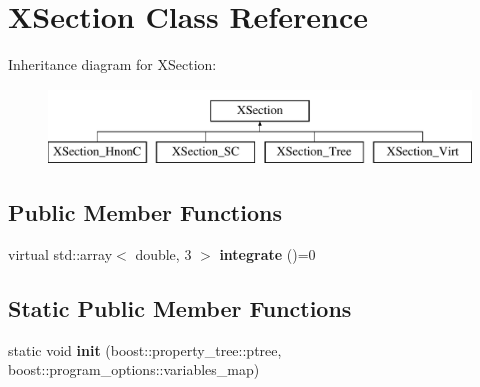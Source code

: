 \hypertarget{classXSection}{}\section{X\+Section Class Reference}
\label{classXSection}
Inheritance diagram for X\+Section\+:\begin{figure}[H]
\begin{center}
\leavevmode
\includegraphics[height=2.000000cm]{classXSection}
\end{center}
\end{figure}
\subsection*{Public Member Functions}
\begin{DoxyCompactItemize}
\item 
\mbox{\label{classXSection_ad697c9f68154808c927267666e8a1d37}} 
virtual std\+::array$<$ double, 3 $>$ {\bfseries integrate} ()=0
\end{DoxyCompactItemize}
\subsection*{Static Public Member Functions}
\begin{DoxyCompactItemize}
\item 
\mbox{\label{classXSection_a6cc33979c6bb62f6812a7e3768f84032}} 
static void {\bfseries init} (boost\+::property\+\_\+tree\+::ptree, boost\+::program\+\_\+options\+::variables\+\_\+map)
\end{DoxyCompactItemize}
